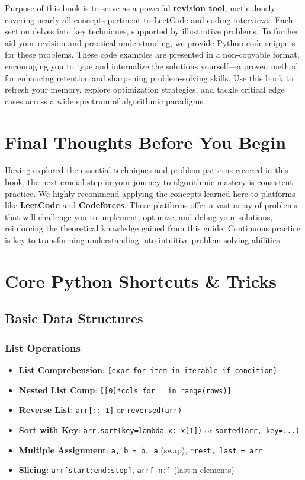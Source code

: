 Purpose of this book is to serve as a powerful \textbf{revision tool}, meticulously covering nearly all concepts pertinent to LeetCode and coding interviews. Each section delves into key techniques, supported by illustrative problems. To further aid your revision and practical understanding, we provide Python code snippets for these problems. These code examples are presented in a non-copyable format, encouraging you to type and internalize the solutions yourself—a proven method for enhancing retention and sharpening problem-solving skills. Use this book to refresh your memory, explore optimization strategies, and tackle critical edge cases across a wide spectrum of algorithmic paradigms.

\chapter*{Final Thoughts Before You Begin}
\onehalfspacing
\justifying

Having explored the essential techniques and problem patterns covered in this book, the next crucial step in your journey to algorithmic mastery is consistent practice. We highly recommend applying the concepts learned here to platforms like \textbf{LeetCode} and \textbf{Codeforces}. These platforms offer a vast array of problems that will challenge you to implement, optimize, and debug your solutions, reinforcing the theoretical knowledge gained from this guide. Continuous practice is key to transforming understanding into intuitive problem-solving abilities.
\newpage


\chapter{Core Python Shortcuts \& Tricks}
\section*{Basic Data Structures}
\subsection{List Operations}
\begin{itemize}
    \item \textbf{List Comprehension}: \texttt{[expr for item in iterable if condition]}
    \item \textbf{Nested List Comp}: \texttt{[[0]*cols for \_ in range(rows)]}
    \item \textbf{Reverse List}: \texttt{arr[::-1]} or \texttt{reversed(arr)}
    \item \textbf{Sort with Key}: \texttt{arr.sort(key=lambda x: x[1])} or \texttt{sorted(arr, key=...)}
    \item \textbf{Multiple Assignment}: \texttt{a, b = b, a} (swap), \texttt{*rest, last = arr}
    \item \textbf{Slicing}: \texttt{arr[start:end:step]}, \texttt{arr[-n:]} (last n elements)
\end{itemize}

